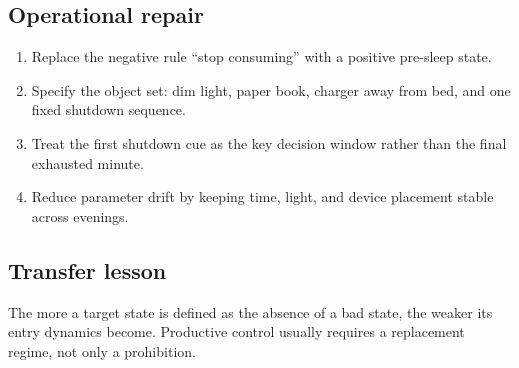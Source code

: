 \subsection*{Operational repair}
\begin{enumerate}[nosep]
  \item Replace the negative rule ``stop consuming'' with a positive pre-sleep
        state.
  \item Specify the object set: dim light, paper book, charger away from bed,
        and one fixed shutdown sequence.
  \item Treat the first shutdown cue as the key decision window rather than the
        final exhausted minute.
  \item Reduce parameter drift by keeping time, light, and device placement
        stable across evenings.
\end{enumerate}

\subsection*{Transfer lesson}
The more a target state is defined as the absence of a bad state, the weaker
its entry dynamics become. Productive control usually requires a replacement
regime, not only a prohibition.

